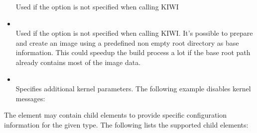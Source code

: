 \begin{itemize}
      Used if the option  is not specified when calling KIWI
\item {}\\
      Used if the option  is not specified when
      calling KIWI. It's possible to prepare and create an image using a
      predefined non empty root directory as base information.
      This could speedup the build process a lot if the base root path
      already contains most of the image data.
\item {}\\
      Specifies additional kernel parameters. The following example
      disables kernel messages: 
\end{itemize}

The  element may contain child elements to provide specific
configuration information for the given type. The following lists the 
supported child elements:

